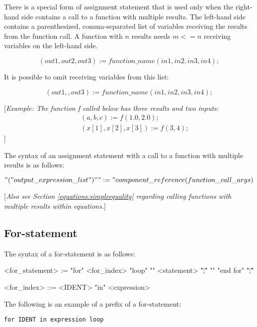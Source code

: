 \documentclass[11pt,a4paper,notitlepage]{report}
\begin{document}
There is a special form of assignment statement that is used only when the right-hand side contains a call to a
function with multiple results. The left-hand side contains a parenthesized, comma-separated list of variables
receiving the results from the function call. A function with $n$ results needs $m<=n$ receiving variables on the left-hand side.

\begin{equation*}
(out1, out2, out3) := function\_name(in1, in2, in3, in4);
\end{equation*}

It is possible to omit receiving variables from this list:

\begin{equation*}
(out1,, out3) := function\_name(in1, in2, in3, in4);
\end{equation*}

[\emph{Example: The function f called below has three results and two inputs:}
\begin{eqnarray*}
 &&(a, b, c) := f(1.0, 2.0); \\
 &&(x[1], x[2], x[3]) := f(3,4);
\end{eqnarray*}]

The syntax of an assignment statement with a call to a function with multiple results is as follows:

\begin{equation*}
"(" output\_expression\_list ")" ":=" component\_reference(function\_call\_args)
\end{equation*}


[\emph{Also see Section \ref{equations:simpleequality} regarding calling functions with multiple results within equations.}]

\subsection{For-statement}

The syntax of a for-statement is as follows:


\begin{grammar}
<for_statement> := "for" <for_index> "loop"
  "{" <statement> "\";\"" "}"
"end for" "\";\""
\end{grammar}

\begin{grammar}
<for_index> ::=
	<IDENT>  "in" <expression>
\end{grammar}

The following is an example of a prefix of a for-statement:
\begin{verbatim}
for IDENT in expression loop
\end{verbatim}
\end{document}

